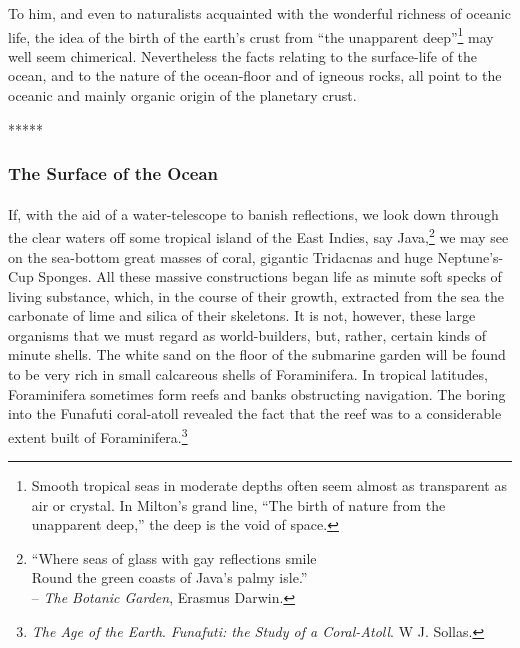 \documentclass[a4paper, 12pt, oneside]{article}
\begin{document}
To him, and even to naturalists acquainted with the wonderful richness of oceanic life, the idea of the birth of the earth's crust from ``the unapparent deep''\footnote{Smooth tropical seas in moderate depths often seem almost as transparent as air or crystal. In Milton's grand line, ``The birth of nature from the unapparent deep,'' the deep is the void of space.} may well seem chimerical. Nevertheless the facts relating to the surface-life of the ocean, and to the nature of the ocean-floor and of igneous rocks, all point to the oceanic and mainly organic origin of the planetary crust.

\centerline{*\hspace{15mm}*\hspace{15mm}*\hspace{15mm}*\hspace{15mm}*}
\bigskip

\subsubsection{The Surface of the Ocean}
\paragraph{}
If, with the aid of a water-telescope to banish reflections, we look down through the clear waters off some tropical island of the East Indies, say Java,\footnote{``Where seas of glass with gay reflections smile\\\hspace*{5mm}Round the green coasts of Java's palmy isle.''\\\hspace*{10mm}-- \emph{The Botanic Garden}, Erasmus Darwin.} we may see on the sea-bottom great masses of coral, gigantic Tridacnas and huge Neptune's-Cup Sponges. All these massive constructions began life as minute soft specks of living substance, which, in the course of their growth, extracted from the sea the carbonate of lime and silica of their skeletons. It is not, however, these large organisms that we must regard as world-builders, but, rather, certain kinds of minute shells. The white sand on the floor of the submarine garden will be found to be very rich in small calcareous shells of Foraminifera. In tropical latitudes, Foraminifera sometimes form reefs and banks obstructing navigation. The boring into the Funafuti coral-atoll revealed the fact that the reef was to a considerable extent built of Foraminifera.\footnote{\emph{The Age of the Earth}. \emph{Funafuti: the Study of a Coral-Atoll}. W J. Sollas.}
\end{document}
